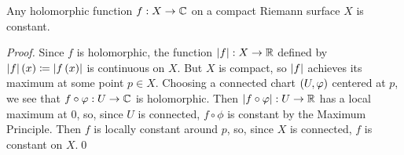 \documentclass[../Moduli_Spaces_of_Riemann_Surfaces.tex]{subfiles}
\begin{document}
    \begin{proposition}\label{RS:prp:holomorphic_compact_constant}
        Any holomorphic function $f:X\to\mathbb{C}$ on a compact Riemann surface $X$ is constant.
    \end{proposition}
    \begin{proof}
        Since $f$ is holomorphic, the function $\left|f\right|:X\to\mathbb{R}$ defined by $\left|f\right|\left(x\right)\coloneqq\left|f\left(x\right)\right|$ is continuous on $X$. But $X$ is compact, so $\left|f\right|$ achieves its maximum at some point $p\in X$. Choosing a connected chart $\left(U,\varphi\right)$ centered at $p$, we see that $f\circ\varphi:U\to\mathbb{C}$ is holomorphic. Then $\left|f\circ\varphi\right|:U\to\mathbb{R}$ has a local maximum at $0$, so, since $U$ is connected, $f\circ\phi$ is constant by the Maximum Principle. Then $f$ is locally constant around $p$, so, since $X$ is connected, $f$ is constant on $X$.\qed
    \end{proof}
\end{document}
